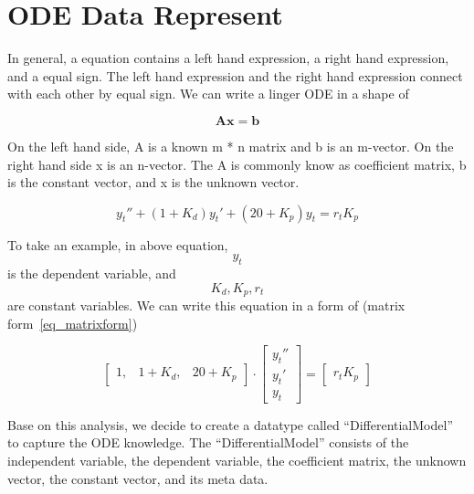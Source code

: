 \chapter{ODE Data Represent}
In general, a equation contains a left hand expression, a right hand expression, and a equal sign. The left hand expression and the right hand expression connect with each other by equal sign. We can write a linger ODE in a shape of

\begin{equation} \label{eq_matrixform}
	\boldsymbol{Ax} = \boldsymbol{b}
\end{equation}

On the left hand side, A is a known m * n matrix and b is an m-vector. On the right hand side x is an n-vector. The A is commonly know as coefficient matrix, b is the constant vector, and x is the unknown vector.

\begin{equation} \label{eq_odeexmaple}
	y_t'' + (1 + K_d)y_t' + (20 + K_p)y_t = r_t K_p
\end{equation}

To take an example, in above equation, \[y_t\] is the dependent variable, and \[K_d, K_p, r_t\] are constant variables. We can write this equation in a form of (matrix form~\ref{eq_matrixform})

\[
\begin{bmatrix}
    1, & 1 + K_{d}, & 20 + K_{p}
\end{bmatrix}
\cdot
\begin{bmatrix}
    y_{t}''  \\
    y_{t}'   \\
    y_{t}  
\end{bmatrix}
=
\begin{bmatrix}
    r_{t} K_{p} 
\end{bmatrix}
\]

Base on this analysis, we decide to create a datatype called ``DifferentialModel'' to capture the ODE knowledge. The ``DifferentialModel'' consists of the independent variable, the dependent variable, the coefficient matrix, the unknown vector, the constant vector, and its meta data.

